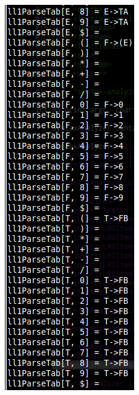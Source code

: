 \documentclass{article}
\begin{document}
\begin{CJK*}{UTF8}{gbsn}
\begin{figure}
        \centering
        \begin{subfigure}[b]{0.3\textwidth}
                \includegraphics[width=\textwidth]{ll1.png}

\end{subfigure}
\end{figure}
\end{CJK*}
\end{document}
